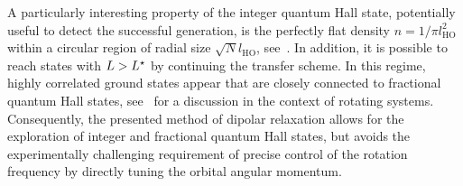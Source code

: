 A particularly interesting property of the integer quantum Hall state, potentially useful to detect the successful generation, is the perfectly flat density $n=1/\pi l_\text{HO}^2$ within a circular region of radial size $\sqrt{N}l_\text{HO}$, see~.
In addition, it is possible to reach states with $L>L^{\star}$ by continuing the transfer scheme.
In this regime,
highly correlated ground states appear that are closely connected to fractional quantum Hall states, see~\cite{Osterloh2007} for a discussion in the context of rotating systems. Consequently, the presented method of dipolar relaxation allows for the exploration of integer and fractional quantum Hall states, but avoids the experimentally challenging requirement of precise control of the rotation frequency by directly tuning the orbital angular momentum.






